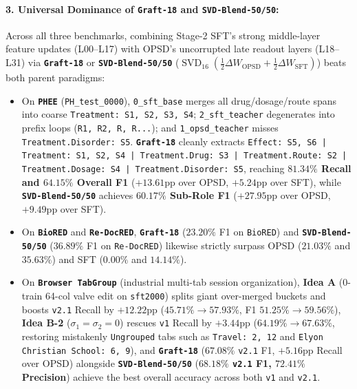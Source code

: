 \documentclass[11pt,a4paper]{article}
\begin{document}
\paragraph{3. Universal Dominance of \texttt{Graft-18} and \texttt{SVD-Blend-50/50}:}
Across all three benchmarks, combining Stage-2 SFT's strong middle-layer feature updates (L00--L17) with OPSD's uncorrupted late readout layers (L18--L31) via \textbf{\texttt{Graft-18}} or \textbf{\texttt{SVD-Blend-50/50}} ($\operatorname{SVD}_{16}(\frac{1}{2}\Delta W_{\text{OPSD}} + \frac{1}{2}\Delta W_{\text{SFT}})$) beats both parent paradigms:
\begin{itemize}
    \item On \textbf{\texttt{PHEE}} (\texttt{PH\_test\_0000}), \texttt{0\_sft\_base} merges all drug/dosage/route spans into coarse \texttt{Treatment: S1, S2, S3, S4}; \texttt{2\_sft\_teacher} degenerates into prefix loops (\texttt{R1, R2, R, R...}); and \texttt{1\_opsd\_teacher} misses \texttt{Treatment.Disorder: S5}. \textbf{\texttt{Graft-18}} cleanly extracts \texttt{Effect: S5, S6 | Treatment: S1, S2, S4 | Treatment.Drug: S3 | Treatment.Route: S2 | Treatment.Dosage: S4 | Treatment.Disorder: S5}, reaching \textbf{$81.34\%$ Recall and $64.15\%$ Overall F1} ($+13.61\text{pp}$ over OPSD, $+5.24\text{pp}$ over SFT), while \textbf{\texttt{SVD-Blend-50/50}} achieves \textbf{$60.17\%$ Sub-Role F1} ($+27.95\text{pp}$ over OPSD, $+9.49\text{pp}$ over SFT).
    \item On \textbf{\texttt{BioRED}} and \textbf{\texttt{Re-DocRED}}, \textbf{\texttt{Graft-18}} ($23.20\%$ F1 on \texttt{BioRED}) and \textbf{\texttt{SVD-Blend-50/50}} ($36.89\%$ F1 on \texttt{Re-DocRED}) likewise strictly surpass OPSD ($21.03\%$ and $35.63\%$) and SFT ($0.00\%$ and $14.14\%$).
    \item On \textbf{\texttt{Browser TabGroup}} (industrial multi-tab session organization), \textbf{Idea A} (0-train 64-col valve edit on \texttt{sft2000}) splits giant over-merged buckets and boosts \texttt{v2.1} Recall by $+12.22\text{pp}$ ($45.71\% \to 57.93\%$, F1 $51.25\% \to 59.56\%$), \textbf{Idea B-2} ($\sigma_1=\sigma_2=0$) rescues \texttt{v1} Recall by $+3.44\text{pp}$ ($64.19\% \to 67.63\%$, restoring mistakenly \texttt{Ungrouped} tabs such as \texttt{Travel: 2, 12} and \texttt{Elyon Christian School: 6, 9}), and \textbf{\texttt{Graft-18}} ($67.08\%$ \texttt{v2.1} F1, $+5.16\text{pp}$ Recall over OPSD) alongside \textbf{\texttt{SVD-Blend-50/50}} (\textbf{$68.18\%$ \texttt{v2.1} F1, $72.41\%$ Precision}) achieve the best overall accuracy across both \texttt{v1} and \texttt{v2.1}.
\end{itemize}
\end{document}
